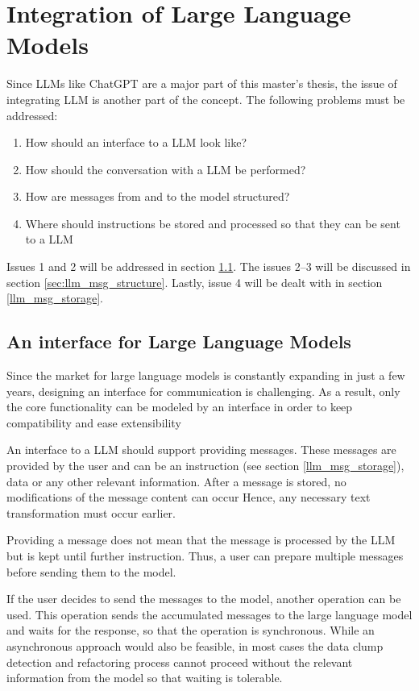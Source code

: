 \section{Integration of Large Language Models}

Since \acp{LLM} like ChatGPT are a major part of this master's thesis, the issue of integrating \ac{LLM} is another part of the concept. The following problems must be addressed:
\begin{enumerate}
    \item How should an interface to a \ac{LLM} look like?
    \item How should the conversation with a \ac{LLM} be performed?
    \item How are messages from and to the model structured?
    \item Where should instructions be stored and processed so that they can be sent to a \ac{LLM}
\end{enumerate}
Issues 1 and 2 will be addressed in section \ref{sec:llm_interface}. The issues 2--3 will be discussed in section \ref{sec:llm_msg_structure}. Lastly, issue 4 will be dealt with in section \ref{llm_msg_storage}.
\subsection{An interface for Large Language Models}\label{sec:llm_interface}

Since the market for large language models is constantly expanding in just a few years, designing an interface for communication is challenging. As a result, only the core functionality can be modeled by an interface in order to keep compatibility and ease extensibility

An interface to a \ac{LLM} should support providing messages. These messages are provided by the user and can be an instruction (see  section \ref{llm_msg_storage}), data or any other relevant information. After a message is stored,  no modifications of the message content can occur Hence, any necessary text transformation must occur earlier. 

Providing a message does not mean that the message is processed by the \ac{LLM} but is kept until further instruction. Thus, a user can prepare multiple messages before sending them to the model.

If the user decides to send the messages to the model, another operation can be used. This operation sends the accumulated messages to the large language model and waits for the response, so that the operation is synchronous. While an asynchronous approach would also be feasible, in most cases the data clump detection and refactoring process cannot proceed without the relevant information from the model so that waiting is tolerable. 

